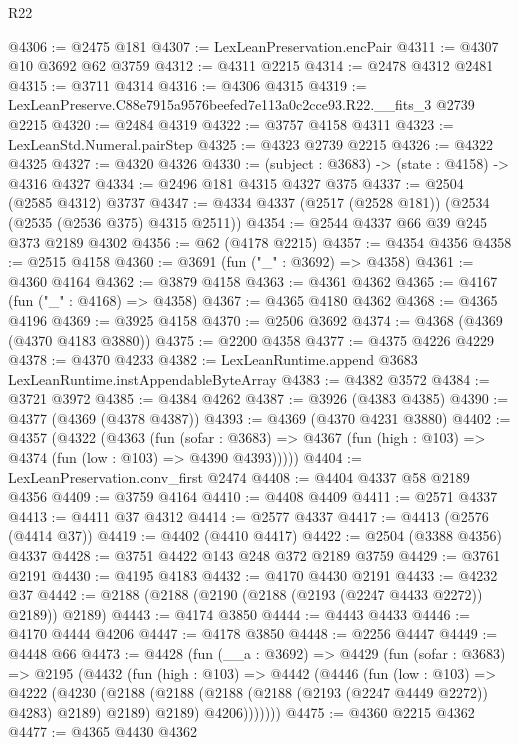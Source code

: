 \begin{lexlean}{R22}
\begin{coremodule}
@4306 := @2475 @181
@4307 := LexLeanPreservation.encPair
@4311 := @4307 @10 @3692 @62 @3759
@4312 := @4311 @2215
@4314 := @2478 @4312 @2481
@4315 := @3711 @4314
@4316 := @4306 @4315
@4319 := LexLeanPreserve.C88e7915a9576beefed7e113a0c2cce93.R22.__fits_3 @2739 @2215
@4320 := @2484 @4319
@4322 := @3757 @4158 @4311
@4323 := LexLeanStd.Numeral.pairStep
@4325 := @4323 @2739 @2215
@4326 := @4322 @4325
@4327 := @4320 @4326
@4330 := (subject : @3683) -> (state : @4158) -> @4316 @4327
@4334 := @2496 @181 @4315 @4327 @375
@4337 := @2504 (@2585 @4312) @3737
@4347 := @4334 @4337 (@2517 (@2528 @181)) (@2534 (@2535 (@2536 @375) @4315 @2511))
@4354 := @2544 @4337 @66 @39 @245 @373 @2189 @4302
@4356 := @62 (@4178 @2215)
@4357 := @4354 @4356
@4358 := @2515 @4158
@4360 := @3691 (fun ("_" : @3692) => @4358)
@4361 := @4360 @4164
@4362 := @3879 @4158
@4363 := @4361 @4362
@4365 := @4167 (fun ("_" : @4168) => @4358)
@4367 := @4365 @4180 @4362
@4368 := @4365 @4196
@4369 := @3925 @4158
@4370 := @2506 @3692
@4374 := @4368 (@4369 (@4370 @4183 @3880))
@4375 := @2200 @4358
@4377 := @4375 @4226 @4229
@4378 := @4370 @4233
@4382 := LexLeanRuntime.append @3683 LexLeanRuntime.instAppendableByteArray
@4383 := @4382 @3572
@4384 := @3721 @3972
@4385 := @4384 @4262
@4387 := @3926 (@4383 @4385)
@4390 := @4377 (@4369 (@4378 @4387))
@4393 := @4369 (@4370 @4231 @3880)
@4402 := @4357
    (@4322
      (@4363
        (fun (sofar : @3683) =>
        @4367 (fun (high : @103) => @4374 (fun (low : @103) => @4390 @4393)))))
@4404 := LexLeanPreservation.conv_first @2474
@4408 := @4404 @4337 @58 @2189 @4356
@4409 := @3759 @4164
@4410 := @4408 @4409
@4411 := @2571 @4337
@4413 := @4411 @37 @4312
@4414 := @2577 @4337
@4417 := @4413 (@2576 (@4414 @37))
@4419 := @4402 (@4410 @4417)
@4422 := @2504 (@3388 @4356) @4337
@4428 := @3751 @4422 @143 @248 @372 @2189 @3759
@4429 := @3761 @2191
@4430 := @4195 @4183
@4432 := @4170 @4430 @2191
@4433 := @4232 @37
@4442 := @2188 (@2188 (@2190 (@2188 (@2193 (@2247 @4433 @2272)) @2189)) @2189)
@4443 := @4174 @3850
@4444 := @4443 @4433
@4446 := @4170 @4444 @4206
@4447 := @4178 @3850
@4448 := @2256 @4447
@4449 := @4448 @66
@4473 := @4428
    (fun (__a : @3692) =>
    @4429
      (fun (sofar : @3683) =>
      @2195
        (@4432
          (fun (high : @103) =>
          @4442
            (@4446
              (fun (low : @103) =>
              @4222
                (@4230
                  (@2188
                    (@2188 (@2188 (@2188 (@2193 (@2247 @4449 @2272)) @4283) @2189) @2189)
                    @2189)
                  @4206)))))))
@4475 := @4360 @2215 @4362
@4477 := @4365 @4430 @4362

\end{coremodule}
\end{lexlean}
